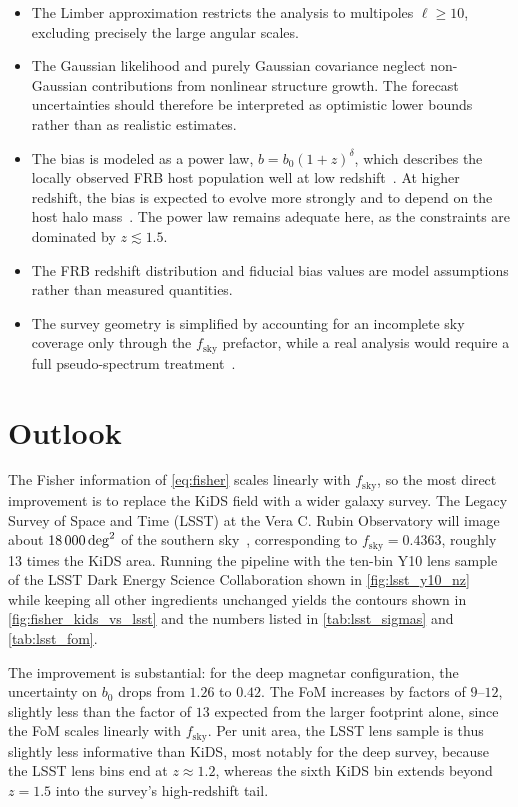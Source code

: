\begin{itemize}
    \item The Limber approximation restricts the analysis to multipoles $\ell \geq 10$,
    excluding precisely the large angular scales.
    \item The Gaussian likelihood and purely Gaussian covariance neglect non-Gaussian contributions
    from nonlinear structure growth. The forecast uncertainties should therefore be interpreted as
    optimistic lower bounds rather than as realistic estimates.
    \item The bias is modeled as a power law, $b = b_0(1+z)^{\delta}$, which describes the
    locally observed FRB host population well at low redshift~\cite{Berti_2021}. At higher redshift,
    the bias is expected to evolve more strongly and to depend on the host halo mass~\cite{Pan_2020,Tinker_2010}.
    The power law remains adequate here, as the constraints are dominated
    by $z \lesssim 1.5$.
    \item The FRB redshift distribution and fiducial bias values are model assumptions rather than
    measured quantities.
    \item The survey geometry is simplified by accounting for an incomplete sky coverage only
    through the $f_{\mathrm{sky}}$ prefactor, while a real analysis would require a full
    pseudo-spectrum treatment~\cite{Hivon_2002}.
\end{itemize}

\section{Outlook} \label{sec:outlook}

The Fisher
information of \autoref{eq:fisher} scales linearly with $f_{\mathrm{sky}}$, so the most direct improvement
is to replace the KiDS field with a wider galaxy survey. The Legacy Survey of Space and Time
(LSST) at the Vera C. Rubin Observatory will image about $\qty{18000}{\deg\squared}$ of the
southern sky~\cite{Ivezic_2019}, corresponding to $f_{\mathrm{sky}} = 0.4363$, roughly 13
times the KiDS area. Running the pipeline with the ten-bin Y10 lens sample of the LSST Dark Energy Science Collaboration
shown in \autoref{fig:lsst_y10_nz}~\cite{Zhang_2025_LSST}
while keeping all other ingredients unchanged yields the contours shown in
\autoref{fig:fisher_kids_vs_lsst} and the numbers listed in \autoref{tab:lsst_sigmas} and \autoref{tab:lsst_fom}.

The improvement is substantial: for the deep magnetar configuration, the uncertainty on $b_0$ drops from
$1.26$ to $0.42$. The FoM increases by factors of $9$--$12$, slightly less than the factor of $13$
expected from the larger footprint alone, since the FoM scales linearly with
$f_{\mathrm{sky}}$. Per unit area, the LSST lens sample is thus slightly less informative than KiDS,
most notably for the deep survey, because the LSST lens bins end at $z \approx 1.2$, whereas the sixth
KiDS bin extends beyond $z = 1.5$ into the survey's high-redshift tail.

